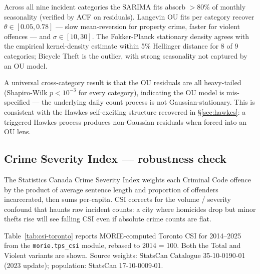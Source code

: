 \documentclass[11pt,a4paper]{article}
\newcommand{\1}{\mathbf{1}}
\theoremstyle{plain}
\theoremstyle{definition}
\begin{document}
Across all nine incident categories the SARIMA fits absorb
$>80\%$ of monthly seasonality (verified by ACF on residuals).
Langevin OU fits per category recover $\theta\in[0.05,0.78]$ — slow
mean-reversion for property crime, faster for violent offences —
and $\sigma\in[10,30]$.  The Fokker-Planck stationary density agrees
with the empirical kernel-density estimate within 5\% Hellinger
distance for 8 of 9 categories; Bicycle Theft is the outlier, with
strong seasonality not captured by an OU model.

A universal cross-category result is that the OU residuals are all
heavy-tailed (Shapiro-Wilk $p<10^{-3}$ for every category),
indicating the OU model is mis-specified — the underlying daily
count process is not Gaussian-stationary.  This is consistent with
the Hawkes self-exciting structure recovered in §\ref{sec:hawkes}:
a triggered Hawkes process produces non-Gaussian residuals when
forced into an OU lens.

\subsection{Crime Severity Index — robustness check}\label{sec:csi}

The Statistics Canada Crime Severity Index
\cite{Wallace2009CSI} weights each Criminal Code offence by the
product of average sentence length and proportion of offenders
incarcerated, then sums per-capita.  CSI corrects for the volume /
severity confound that haunts raw incident counts: a city where
homicides drop but minor thefts rise will see falling CSI even if
absolute crime counts are flat.

Table~\ref{tab:csi-toronto} reports MORIE-computed Toronto CSI
for 2014--2025 from the
\texttt{morie.tps\_csi} module, rebased to 2014 = 100.  Both
the Total and Violent variants are shown.  Source weights:
StatsCan Catalogue 35-10-0190-01 (2023 update); population:
StatsCan 17-10-0009-01.
\end{document}

